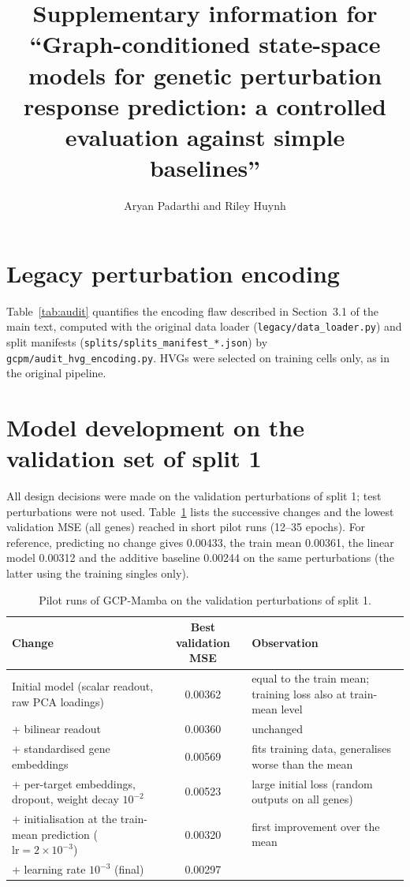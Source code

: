 \documentclass[10pt]{article}
\title{Supplementary information for\\``Graph-conditioned state-space models for genetic perturbation
response prediction: a controlled evaluation against simple baselines''}
\author{Aryan Padarthi and Riley Huynh}
\date{}
\begin{document}
\maketitle

\section{Legacy perturbation encoding}
Table~\ref{tab:audit} quantifies the encoding flaw described in Section~3.1 of the main text, computed
with the original data loader (\texttt{legacy/data\_loader.py}) and split manifests
(\texttt{splits/splits\_manifest\_*.json}) by \texttt{gcpm/audit\_hvg\_encoding.py}. HVGs were selected
on training cells only, as in the original pipeline.



\section{Model development on the validation set of split 1}
All design decisions were made on the validation perturbations of split 1; test perturbations were not
used. Table~\ref{tab:pilot} lists the successive changes and the lowest validation MSE (all genes)
reached in short pilot runs (12--35 epochs). For reference, predicting no change gives 0.00433, the
train mean 0.00361, the linear model 0.00312 and the additive baseline 0.00244 on the same perturbations
(the latter using the training singles only).

\begin{table}[h]
\caption{Pilot runs of GCP-Mamba on the validation perturbations of split 1.}\label{tab:pilot}
\centering\small
\begin{tabular}{p{6.4cm}cp{5.6cm}}
\toprule
Change & Best validation MSE & Observation\\
\midrule
Initial model (scalar readout, raw PCA loadings) & 0.00362 & equal to the train mean; training loss also at train-mean level\\
+ bilinear readout & 0.00360 & unchanged\\
+ standardised gene embeddings & 0.00569 & fits training data, generalises worse than the mean\\
+ per-target embeddings, dropout, weight decay $10^{-2}$ & 0.00523 & large initial loss (random outputs on all genes)\\
+ initialisation at the train-mean prediction ($\text{lr}=2\times10^{-3}$) & 0.00320 & first improvement over the mean\\
+ learning rate $10^{-3}$ (final) & 0.00297 & \\
\bottomrule
\end{tabular}
\end{table}
\end{document}
